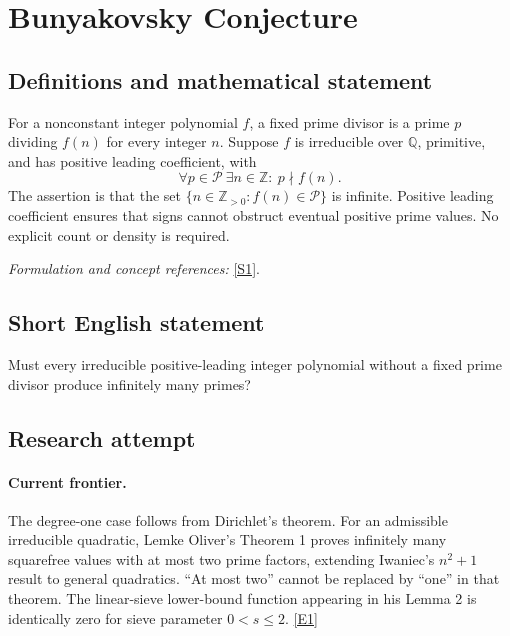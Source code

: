 \documentclass[11pt]{article}
\newcommand{\Z}{\mathbb{Z}}
\newcommand{\Q}{\mathbb{Q}}
\newcommand{\sref}[2]{\hyperlink{source:#1:#2}{[S#2]}}
\newcommand{\eref}[2]{\hyperlink{extra:#1:#2}{[E#2]}}
\newif\ifshowcatalogue
\newcommand{\cataloguescope}[1]{\ifshowcatalogue
 \paragraph{Exact scope in the supplied catalogue.}
 \begin{quote}\small #1\end{quote}\fi}
\begin{document}
\setcounter{section}{0}
\clearpage
\section*{\texorpdfstring{Bunyakovsky Conjecture}{Bunyakovsky Conjecture}}\label{1292}
\subsection{Definitions and mathematical statement}
For a nonconstant integer polynomial $f$, a fixed prime divisor is a prime $p$ dividing $f(n)$ for every integer $n$. Suppose $f$ is irreducible over $\Q$, primitive, and has positive leading coefficient, with
\[
 \forall p\in\mathcal P\ \exists n\in\Z:\ p\nmid f(n).
\]
The assertion is that the set $\{n\in\Z_{>0}:f(n)\in\mathcal P\}$ is infinite. Positive leading coefficient ensures that signs cannot obstruct eventual positive prime values. No explicit count or density is required.
\par\smallskip\textit{Formulation and concept references:} \sref{1292}{1}.
\cataloguescope{Prove or disprove that every irreducible polynomial f in Z[x] with positive leading coefficient and no fixed prime divisor takes prime values for infinitely many positive integer inputs.}
\subsection{Short English statement}
Must every irreducible positive-leading integer polynomial without a fixed prime divisor produce infinitely many primes?
\subsection{Research attempt}

\paragraph{Current frontier.}
The degree-one case follows from Dirichlet's theorem. For an admissible
irreducible quadratic, Lemke Oliver's Theorem 1 proves infinitely many
squarefree values with at most two prime factors, extending Iwaniec's
$n^2+1$ result to general quadratics. ``At most two'' cannot be replaced by
``one'' in that theorem. The linear-sieve lower-bound function appearing in
his Lemma 2 is identically zero for sieve parameter $0<s\le2$.
\eref{1292}{1}
\end{document}
